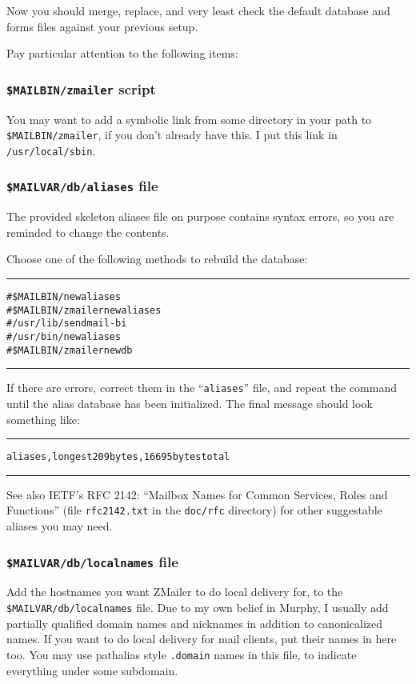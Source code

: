 Now you should merge, replace, and very least check the default database
and forms files against your previous setup.

Pay particular attention to the following items:

\subsubsection{{\tt \$MAILBIN/zmailer} script}

You may want to add a symbolic link from some directory in your path
to {\tt \$MAILBIN/zmailer}, if you don't already have this.  I put this link
in {\tt /usr/local/sbin}.

\subsubsection{{\tt \$MAILVAR/db/aliases} file}

The provided skeleton aliases file on purpose contains syntax errors,
so you are reminded to change the contents.

Choose one of the following methods to rebuild the database:
\begin{alltt}\medskip\hrule\medskip
# \$MAILBIN/newaliases
# \$MAILBIN/zmailer newaliases
# /usr/lib/sendmail -bi
# /usr/bin/newaliases
# \$MAILBIN/zmailer newdb
\medskip\hrule\medskip\end{alltt}

If there are errors, correct them in the ``{\tt aliases}'' file,
and repeat the command until the alias database has been initialized.
The final message should look something like:
\begin{alltt}\medskip\hrule{} aliases, longest 209 bytes, 16695 bytes total
\medskip\hrule\end{alltt}\medskip

See also IETF's RFC 2142: ``Mailbox Names for Common Services, Roles and
Functions'' (file {\tt rfc2142.txt} in the {\tt doc/rfc} directory) 
for other suggestable aliases you may need. 


\subsubsection{{\tt \$MAILVAR/db/localnames} file}

%
\label{configure_localnames_file}

Add the hostnames you want ZMailer to do local delivery for, to the
{\tt \$MAILVAR/db/localnames} file.  Due to my own belief in Murphy,
I usually add partially qualified domain names and nicknames in
addition to canonicalized names.  If you want to do local delivery
for mail clients, put their names in here too.  You may use pathalias 
style {\tt.domain} names in this file, to indicate everything under some
subdomain.

